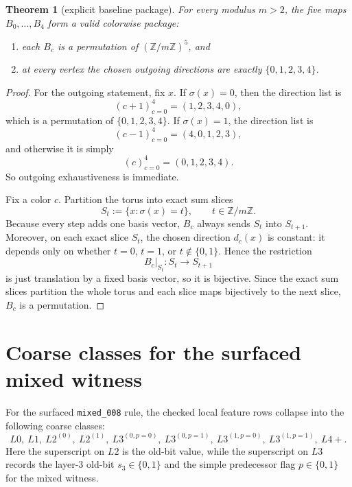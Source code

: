 \documentclass[11pt]{article}
\newtheorem{theorem}{Theorem}
\begin{document}
\begin{theorem}[explicit baseline package]
\label{thm:explicit-baseline}
For every modulus \(m>2\), the five maps \(B_0,\dots,B_4\) form a valid
colorwise package:
\begin{enumerate}[label=\textup{(\arabic*)},leftmargin=2.8em]
\item each \(B_c\) is a permutation of \((\mathbb Z/m\mathbb Z)^5\), and
\item at every vertex the chosen outgoing directions are exactly
      \(\{0,1,2,3,4\}\).
\end{enumerate}
\end{theorem}

\begin{proof}
For the outgoing statement, fix \(x\).
If \(\sigma(x)=0\), then the direction list is
\[
(c+1)_{c=0}^4=(1,2,3,4,0),
\]
which is a permutation of \(\{0,1,2,3,4\}\).
If \(\sigma(x)=1\), the direction list is
\[
(c-1)_{c=0}^4=(4,0,1,2,3),
\]
and otherwise it is simply
\[
(c)_{c=0}^4=(0,1,2,3,4).
\]
So outgoing exhaustiveness is immediate.

Fix a color \(c\).
Partition the torus into exact sum slices
\[
S_t:=\{x:\sigma(x)=t\},\qquad t\in\mathbb Z/m\mathbb Z.
\]
Because every step adds one basis vector, \(B_c\) always sends \(S_t\) into
\(S_{t+1}\).
Moreover, on each exact slice \(S_t\), the chosen direction \(d_c(x)\) is
constant: it depends only on whether \(t=0\), \(t=1\), or \(t\notin\{0,1\}\).
Hence the restriction
\[
B_c\vert_{S_t}\colon S_t\to S_{t+1}
\]
is just translation by a fixed basis vector, so it is bijective.
Since the exact sum slices partition the whole torus and each slice maps
bijectively to the next slice, \(B_c\) is a permutation.
\end{proof}

\section{Coarse classes for the surfaced mixed witness}
For the surfaced \texttt{mixed\_008} rule, the checked local feature rows collapse
into the following coarse classes:
\[
L0,\ L1,\ L2^{(0)},\ L2^{(1)},\ L3^{(0,p=0)},\ L3^{(0,p=1)},\ L3^{(1,p=0)},\ L3^{(1,p=1)},\ L4+.
\]
Here the superscript on \(L2\) is the old-bit value, while the superscript on
\(L3\) records the layer-3 old-bit \(s_3\in\{0,1\}\) and the simple predecessor
flag \(p\in\{0,1\}\) for the mixed witness.
\end{document}
